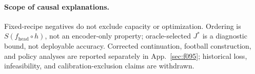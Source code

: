 \paragraph{Scope of causal explanations.}
Fixed-recipe negatives do not exclude capacity or optimization. Ordering
is $S(f_{\mathrm{head}}\circ h)$, not an encoder-only property; oracle-selected
$J^*$ is a diagnostic bound, not deployable accuracy. Corrected continuation,
football construction, and policy analyses are reported separately in
App.~\ref{sec:f095}; historical loss, infeasibility, and calibration-exclusion
claims are withdrawn.
